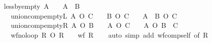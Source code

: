 \begin{isabellebody}
{\isafoldproof}%
%
\isadelimproof
%
\endisadelimproof
%
\isadelimdocument
%
\endisadelimdocument
%
\isatagdocument
%
\isamarkuptrue%
%
\endisatagdocument
{\isafolddocument}%
%
\isadelimdocument
%
\endisadelimdocument
{}\isamarkupfalse%
\ less{\isacharunderscore}{\kern0pt}by{\isacharunderscore}{\kern0pt}empty{\isacharcolon}{\kern0pt}\ {\isachardoublequoteopen}A\ {\isacharequal}{\kern0pt}\ {\isacharbraceleft}{\kern0pt}{\isacharbraceright}{\kern0pt}\ {\isasymLongrightarrow}\ A\ {\isasymsubseteq}\ B{\isachardoublequoteclose}\isanewline
\ \ \ union{\isacharunderscore}{\kern0pt}comp{\isacharunderscore}{\kern0pt}emptyL{\isacharcolon}{\kern0pt}\ {\isachardoublequoteopen}A\ O\ C\ {\isacharequal}{\kern0pt}\ {\isacharbraceleft}{\kern0pt}{\isacharbraceright}{\kern0pt}\ {\isasymLongrightarrow}\ B\ O\ C\ {\isacharequal}{\kern0pt}\ {\isacharbraceleft}{\kern0pt}{\isacharbraceright}{\kern0pt}\ {\isasymLongrightarrow}\ {\isacharparenleft}{\kern0pt}A\ {\isasymunion}\ B{\isacharparenright}{\kern0pt}\ O\ C\ {\isacharequal}{\kern0pt}\ {\isacharbraceleft}{\kern0pt}{\isacharbraceright}{\kern0pt}{\isachardoublequoteclose}\isanewline
\ \ \ union{\isacharunderscore}{\kern0pt}comp{\isacharunderscore}{\kern0pt}emptyR{\isacharcolon}{\kern0pt}\ {\isachardoublequoteopen}A\ O\ B\ {\isacharequal}{\kern0pt}\ {\isacharbraceleft}{\kern0pt}{\isacharbraceright}{\kern0pt}\ {\isasymLongrightarrow}\ A\ O\ C\ {\isacharequal}{\kern0pt}\ {\isacharbraceleft}{\kern0pt}{\isacharbraceright}{\kern0pt}\ {\isasymLongrightarrow}\ A\ O\ {\isacharparenleft}{\kern0pt}B\ {\isasymunion}\ C{\isacharparenright}{\kern0pt}\ {\isacharequal}{\kern0pt}\ {\isacharbraceleft}{\kern0pt}{\isacharbraceright}{\kern0pt}{\isachardoublequoteclose}\isanewline
\ \ \ wf{\isacharunderscore}{\kern0pt}no{\isacharunderscore}{\kern0pt}loop{\isacharcolon}{\kern0pt}\ {\isachardoublequoteopen}R\ O\ R\ {\isacharequal}{\kern0pt}\ {\isacharbraceleft}{\kern0pt}{\isacharbraceright}{\kern0pt}\ {\isasymLongrightarrow}\ wf\ R{\isachardoublequoteclose}\isanewline
%
\isadelimproof
\ \ %
\endisadelimproof
%
\isatagproof
{}\isamarkupfalse%
\ {\isacharparenleft}{\kern0pt}auto\ simp\ add{\isacharcolon}{\kern0pt}\ wf{\isacharunderscore}{\kern0pt}comp{\isacharunderscore}{\kern0pt}self\ {\isacharbrackleft}{\kern0pt}of\ R{\isacharbrackright}{\kern0pt}{\isacharparenright}{\kern0pt}%
\endisatagproof
{\isafoldproof}%
%
\isadelimproof
%
\endisadelimproof
%
\isadelimdocument
%
\endisadelimdocument
%
\isatagdocument
%
\end{isabellebody}
